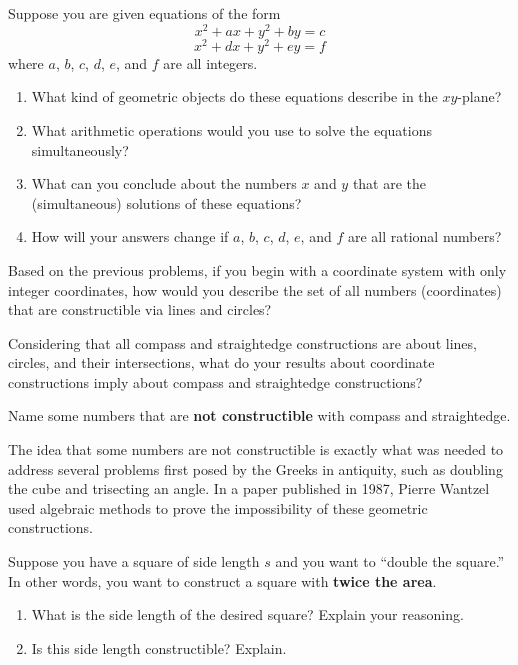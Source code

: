 \begin{prob}
Suppose you are given equations of the form 
$$x^2 + ax +y^2+by = c$$
$$x^2 + dx +y^2+ey = f$$
where $a$, $b$, $c$, $d$, $e$, and $f$ are all integers.  
\begin{enumerate}
\item What kind of geometric objects do these equations describe in the $xy$-plane?  
\item What arithmetic operations would you use to solve the equations simultaneously? 
\item What can you conclude about the numbers $x$ and $y$ that are the (simultaneous) solutions of these equations?  
\item How will your answers change if $a$, $b$, $c$, $d$, $e$, and $f$  are all rational numbers?  
\end{enumerate}
\end{prob}

\begin{prob}
Based on the previous problems, if you begin with a coordinate system with only integer coordinates, how would you describe the set of all numbers (coordinates) that are constructible via lines and circles?  
\end{prob}

\begin{prob}
Considering that all compass and straightedge constructions are about lines, circles, and their intersections, what do your results about coordinate constructions imply about compass and straightedge constructions?  
\end{prob}

\begin{prob}
Name some numbers that are \textbf{not constructible} with compass and straightedge.  
\end{prob}

The idea that some numbers are not constructible is exactly what was needed to address several problems first posed by the Greeks in antiquity, such as doubling the cube and trisecting an angle.  In a paper published in 1987, Pierre Wantzel used algebraic methods to prove the impossibility of these geometric constructions.  

\begin{prob}
Suppose you have a square of side length $s$ and you want to ``double the square.''  In other words, you want to construct a square with \textbf{twice the area}.  
\begin{enumerate}
\item What is the side length of the desired square?  Explain your reasoning. 
\item Is this side length constructible?  Explain.  
\end{enumerate}
\end{prob}

